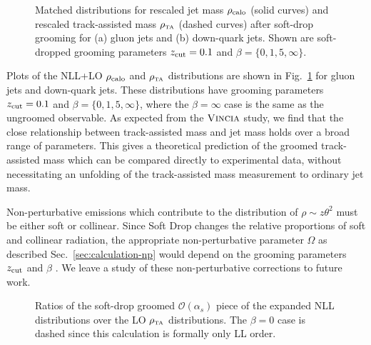 \documentclass[letterpaper,11pt]{article}
\newcommand{\Fig}[1]{Fig.~\ref{#1}}
\newcommand{\Sec}[1]{Sec.~\ref{#1}}
\begin{document}
\begin{figure}[t]
	\centering
	\caption{ Matched distributions for rescaled jet mass $\rho_{\rm calo}$ (solid curves) and rescaled track-assisted mass $\rho_{\mbox{\tiny TA}}$ (dashed curves) after soft-drop grooming for (a) gluon jets and (b) down-quark jets.  Shown are soft-dropped grooming parameters $z_{\rm cut}=0.1$ and $\beta = \{0,1,5,\infty\}$.}
	\label{fig:sd-matched}
\end{figure}


Plots of the NLL+LO $\rho_{\rm calo}$ and $\rho_{\mbox{\tiny TA}}$ distributions are shown in \Fig{fig:sd-matched} for gluon jets and down-quark jets. 
%
These distributions have grooming parameters $z_{\rm cut}=0.1$ and $\beta = \{0,1,5,\infty\}$, where the $\beta=\infty$ case is the same as the ungroomed observable.
%
As expected from the $\textsc{Vincia}$ study, we find that the close relationship between track-assisted mass and jet mass holds over a broad range of parameters. 
%
This gives a theoretical prediction of the groomed track-assisted mass which can be compared directly to experimental data, without necessitating an unfolding of the track-assisted mass measurement to ordinary jet mass. 


Non-perturbative emissions which contribute to the distribution of $\rho \sim z\theta^2$ must be either soft or collinear. 
%
Since Soft Drop changes the relative proportions of soft and collinear radiation, the appropriate non-perturbative parameter $\Omega$ as described \Sec{sec:calculation-np} would depend on the grooming parameters $z_{\rm cut}$ and $\beta$ \cite{Manohar:1994kq,Waalewijn:2012sv,Larkoski:2013paa,Gras:2017jty}. 
%
We leave a study of these non-perturbative corrections to future work. 

\begin{figure}[t]
	\centering
	\caption{Ratios of the soft-drop groomed $\mathcal{O}(\alpha_s)$ piece of the expanded NLL distributions over the LO $\rho_{\mbox{\tiny TA}}$ distributions. The $\beta=0$ case is dashed since this calculation is formally only LL order.}
	\label{fig:sd-ratios} 
\end{figure}
\end{document}
